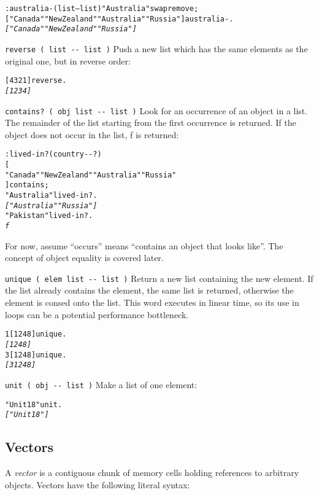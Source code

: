\documentclass[english]{article}
\begin{document}
{\begin{alltt}
: australia- ( list -- list ) "Australia" swap remove ;
{[} "Canada" "New Zealand" "Australia" "Russia" {]} australia- .
\emph{{[} "Canada" "New Zealand" "Russia" {]}}
\end{alltt}

\texttt{reverse ( list -{}- list )} Push a new list which has the
same elements as the original one, but in reverse order:

\begin{alltt}
{[} 4 3 2 1 {]} reverse .
\emph{{[} 1 2 3 4 {]}}
\end{alltt}

\texttt{contains?~( obj list -{}- list )} Look for an occurrence of
an object in a list. The remainder of the list starting from the first
occurrence is returned. If the object does not occur in the list,
f is returned:

\begin{alltt}
: lived-in? ( country -{}- ? )
    {[}
        "Canada" "New Zealand" "Australia" "Russia"
    {]} contains ;
"Australia" lived-in? .
\emph{{[} "Australia" "Russia" {]}}
"Pakistan" lived-in? .
\emph{f}
\end{alltt}

For now, assume {}``occurs'' means {}``contains an object that
looks like''. The concept of object equality is covered later.

\texttt{unique ( elem list -{}- list )} Return a new list containing the new element. If the list already contains the element, the same list is returned, otherwise the element is consed onto the list. This word executes in linear time, so its use in loops can be a potential performance bottleneck.

\begin{alltt}
1 {[} 1 2 4 8 {]} unique .
\emph{{[} 1 2 4 8 {]}}
3 {[} 1 2 4 8 {]} unique .
\emph{{[} 3 1 2 4 8 {]}}
\end{alltt}

\texttt{unit ( obj -{}- list )} Make a list of one element:

\begin{alltt}
"Unit 18" unit .
\emph{{[} "Unit 18" {]}}
\end{alltt}

\subsection{\label{sub:Vectors}Vectors}

A \emph{vector} is a contiguous chunk of memory cells holding references to arbitrary
objects. Vectors have the following literal syntax:

}
\end{document}
